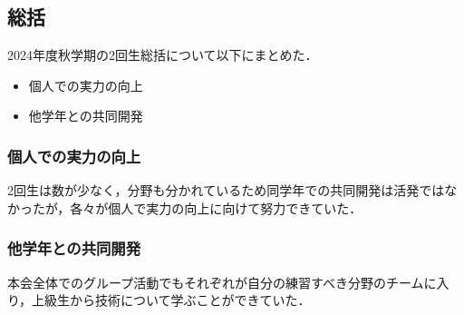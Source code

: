 \subsection*{\secondGrade{}総括}


2024年度秋学期の2回生総括について以下にまとめた．

\begin{itemize}
    \item 個人での実力の向上
    \item 他学年との共同開発
\end{itemize}

\subsubsection*{個人での実力の向上}
2回生は数が少なく，分野も分かれているため同学年での共同開発は活発ではなかったが，各々が個人で実力の向上に向けて努力できていた．

\subsubsection*{他学年との共同開発}
本会全体でのグループ活動でもそれぞれが自分の練習すべき分野のチームに入り，上級生から技術について学ぶことができていた．
